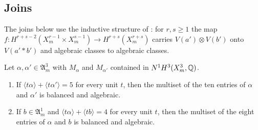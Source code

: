 \subsection{Joins}
The joins below use the inductive structure of : for
$r,s\ge1$ the map $f\colon H^{r+s-2}(X^{r-1}_{m}\times X^{s-1}_{m})\to
H^{r+s}(X^{r+s}_{m})$ carries $V(a')\otimes V(b')$ onto $V(a'*b')$ and
algebraic classes to algebraic classes.

\begin{proposition}\label{prop:joindivisor}
Let $\alpha,\alpha'\in\mathfrak A^{3}_{m}$ with $M_{\alpha}$ and
$M_{\alpha'}$ contained in $N^{1}H^{3}(X^{3}_{m},\mathbb{Q})$.
\begin{enumerate}[label=\textup{(\alph*)}]
\item If $\langle t\alpha\rangle+\langle t\alpha'\rangle=5$ for every unit
$t$, then the multiset of the ten entries of $\alpha$ and $\alpha'$ is
balanced and algebraic.
\item If $b\in\mathfrak A^{1}_{m}$ and $\langle t\alpha\rangle+\langle
tb\rangle=4$ for every unit $t$, then the multiset of the eight entries of
$\alpha$ and $b$ is balanced and algebraic.
\end{enumerate}
\end{proposition}

